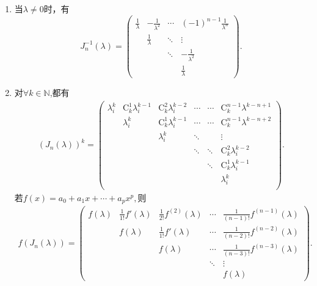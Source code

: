 \documentclass[../../main.tex]{subfiles}
\begin{document}
\begin{proposition}[Jordan块的性质]
\begin{enumerate}[(1)]
\item 当$\lambda\neq 0$时，有
\[
J_n^{-1}(\lambda)=
\begin{pmatrix}
\frac{1}{\lambda} & -\frac{1}{\lambda^2} & \cdots & (-1)^{n - 1}\frac{1}{\lambda^n} \\
 & \frac{1}{\lambda} & \ddots & \vdots \\
 &  & \ddots & -\frac{1}{\lambda^2} \\
 &  &  & \frac{1}{\lambda}
\end{pmatrix}.
\]

\item 对$\forall k\in \mathbb{N}$,都有
\begin{align*}
\left( J_n\left( \lambda \right) \right) ^k=\left( \begin{matrix}
\lambda _{i}^{k}&		\mathrm{C}_{k}^{1}\lambda _{i}^{k-1}&		\mathrm{C}_{k}^{2}\lambda _{i}^{k-2}&		\cdots&		\cdots&		\mathrm{C}_{k}^{n-1}\lambda ^{k-n+1}\\
&		\lambda _{i}^{k}&		\mathrm{C}_{k}^{1}\lambda _{i}^{k-1}&		\cdots&		\cdots&		\mathrm{C}_{k}^{n-1}\lambda ^{k-n+2}\\
&		&		\lambda _{i}^{k}&		\ddots&		&		\vdots\\
&		&		&		\ddots&		\ddots&		\mathrm{C}_{k}^{2}\lambda _{i}^{k-2}\\
&		&		&		&		\ddots&		\mathrm{C}_{k}^{1}\lambda _{i}^{k-1}\\
&		&		&		&		&		\lambda _{i}^{k}\\
\end{matrix} \right) .
\end{align*}
若$f(x)=a_0+a_1x+\cdots+a_px^p,$则
\begin{align*}
f(J_n(\lambda))= \begin{pmatrix}
f(\lambda ) & \frac{1}{1!}f'(\lambda ) & \frac{1}{2!}f^{(2)}(\lambda ) & \cdots & \frac{1}{(n - 1)!}f^{(n - 1)}(\lambda ) \\
& f(\lambda ) & \frac{1}{1!}f'(\lambda ) & \cdots & \frac{1}{(n - 2)!}f^{(n - 2)}(\lambda ) \\
& & f(\lambda ) & \cdots & \frac{1}{(n - 3)!}f^{(n - 3)}(\lambda ) \\
& & & \ddots & \vdots \\
& & & & f(\lambda )
\end{pmatrix}. 
\end{align*}


\end{enumerate}
\end{proposition}
\end{document}
